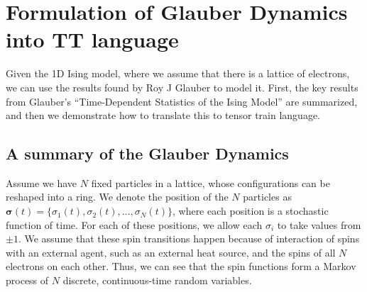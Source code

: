 \documentclass[12pt]{article}
\theoremstyle{definition}
\theoremstyle{remark}
\begin{document}
\newpage 
\section{Formulation of Glauber Dynamics into TT language }\label{sec:glauber}
Given the 1D Ising model, where we assume that there is a lattice of electrons, we can use the results found by Roy J Glauber to model it. First, the key results from Glauber's ``Time-Dependent Statistics of the Ising Model'' are summarized, and then we demonstrate how to translate this to tensor train language.
\subsection{A summary of the Glauber Dynamics}\label{sec:glauber-summary}
Assume we have $N$ fixed particles in a lattice, whose configurations can be reshaped into a ring. We denote the position of the $N$ particles as $\boldsymbol{\sigma}(t) = \{\sigma_1(t), \sigma_2(t), \dots, \sigma_N(t)\}$, where each position is a stochastic function of time. For each of these positions, we allow each $\sigma_i$ to take values from $\pm 1$. We assume that these spin transitions happen because of interaction of spins with an external agent, such as an external heat source, and the spins of all $N$ electrons on each other. Thus, we can see that the spin functions form a Markov process of $N$ discrete, continuous-time random variables.
\end{document}
